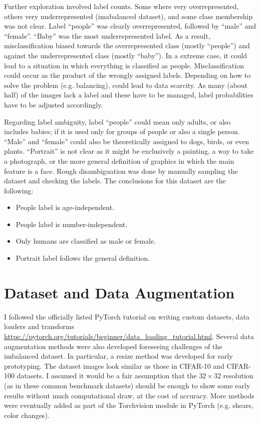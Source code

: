 \documentclass{article}
\begin{document}
Further exploration involved label counts.
Some where very overrepresented, others very underrepresented (imabalanced dataset), and some class membership was not clear.
Label ``people'' was clearly overrepresented, followed by ``male'' and ``female''.
``Baby'' was the most underrepresented label.
As a result, misclassification biased towards the overrepresented class (mostly ``people'') and against the underrepresented class (mostly ``baby'').
In a extreme case, it could lead to a situation in which everything is classified as people.
Misclassification could occur as the product of the wrongly assigned labels.
Depending on how to solve the problem (e.g. balancing), could lead to data scarcity.
As many (about half) of the images lack a label and these have to be managed, label probabilities have to be adjusted accordingly.

Regarding label ambiguity, label ``people'' could mean only adults, or also includes babies; if it is used only for groups of people or also a single person.
``Male'' and ``female'' could also be theoretically assigned to dogs, birds, or even plants.
``Portrait'' is not clear as it might be exclusively a painting, a way to take a photograph, or the more general definition of graphics in which the main feature is a face.
Rough disambiguation was done by manually sampling the dataset and checking the labels.
The conclusions for this dataset are the following:

\begin{itemize}
  \item People label is age-independent.
  \item People label is number-independent.
  \item Only humans are classified as male or female.
  \item Portrait label follows the general definition.
\end{itemize}


\section{Dataset and Data Augmentation}
I followed the officially listed PyTorch tutorial on writing custom datasets, data loaders and transforms \url{https://pytorch.org/tutorials/beginner/data_loading_tutorial.html}.
Several data augmentation methods were also developed foreseeing challenges of the imbalanced dataset.
In particular, a resize method was developed for early prototyping.
The dataset images look similar as those in CIFAR-10 and CIFAR-100 datasets.
I assumed it would be a fair assumption that the \(32 \times 32\) resolution (as in these common benchmark datasets) should be enough to show some early results without much computational draw, at the cost of accuracy.
More methods were eventually added as part of the Torchvision module in PyTorch (e.g. shears, color changes).
\end{document}

